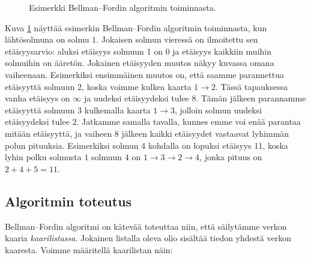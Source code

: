 \begin{figure}
\begin{center}
\end{center}
\caption{Esimerkki Bellman–Fordin algoritmin toiminnasta.}
\label{fig:belfor}
\end{figure}

Kuva \ref{fig:belfor} näyttää esimerkin Bellman–Fordin algoritmin toiminnasta,
kun lähtösolmuna on solmu $1$.
Jokaisen solmun vieressä on ilmoitettu sen etäisyysarvio:
aluksi etäisyys solmuun 1 on 0 ja etäisyys kaikkiin muihin solmuihin on ääretön.
Jokainen etäisyyden muutos näkyy kuvassa omana vaiheenaan.
Esimerkiksi ensimmäinen muutos on,
että saamme parannettua etäisyyttä solmuun 2,
koska voimme kulkea kaarta $1 \rightarrow 2$.
Tässä tapauksessa vanha etäisyys on $\infty$ ja uudeksi
etäisyydeksi tulee $8$.
Tämän jälkeen parannamme etäisyyttä solmuun $3$
kulkemalla kaarta $1 \rightarrow 3$,
jolloin solmun uudeksi etäisyydeksi tulee $2$.
Jatkamme samalla tavalla, kunnes emme voi enää parantaa
mitään etäisyyttä, ja vaiheen $8$ jälkeen kaikki etäisyydet
vastaavat lyhimmän polun pituuksia.
Esimerkiksi solmun 4 kohdalla on lopuksi etäisyys 11,
koska lyhin polku solmusta $1$ solmuun $4$ on
$1 \rightarrow 3 \rightarrow 2 \rightarrow 4$,
jonka pituus on $2+4+5=11$.

\subsection{Algoritmin toteutus}

Bellman–Fordin algoritmi on kätevää toteuttaa niin,
että säilytämme verkon kaaria \emph{kaarilistassa}.
Jokainen listalla oleva olio sisältää tiedon
yhdestä verkon kaaresta.
Voimme määritellä kaarilistan näin:

